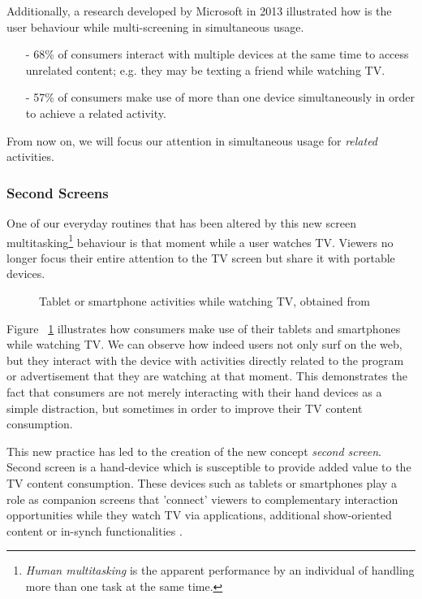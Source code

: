 \documentclass{acm_proc_article-sp}
\begin{document}
Additionally, a research developed by Microsoft in 2013 \cite{microsoftcross} illustrated how is the user behaviour while multi-screening in simultaneous usage.  

\begin{itemize}
  \item[-] 68\% of consumers interact with multiple devices at the same time to access unrelated content; e.g. they may be texting a friend while watching TV. 
  \item[-] 57\% of consumers make use of more than one device simultaneously in order to achieve a related activity. 
\end{itemize}

From now on, we will focus our attention in simultaneous usage for \textit{related} activities.
 	
\subsubsection{Second Screens}

One of our everyday routines that has been altered by this new screen multitasking\footnote{\textit{Human multitasking} is the apparent performance by an individual of handling more than one task at the same time.} behaviour is that moment while a user watches TV. Viewers no longer focus their entire attention to the TV screen but share it with portable devices. 

\begin{figure}[!htb]
	\centering
	\caption{Tablet or smartphone activities while watching TV, obtained from \cite{nielsentv}}
	\label{fig:nielsengraph}
\end{figure}

Figure ~\ref{fig:nielsengraph} illustrates how consumers make use of their tablets and smartphones while watching TV. We can observe how indeed users not only surf on the web, but they interact with the device with activities directly related to the program or advertisement that they are watching at that moment. This demonstrates the fact that consumers are not merely interacting with their hand devices as a simple distraction, but sometimes in order to improve their TV content consumption. 

This new practice has led to the creation of the new concept \textit{second screen}. Second screen is a hand-device which is susceptible to provide added value to the TV content consumption. These devices such as tablets or smartphones play a role as companion
screens that 'connect' viewers to complementary interaction
opportunities while they watch TV via applications, additional
show-oriented content or in-synch functionalities \cite{evolumedia2}. 
\end{document}
